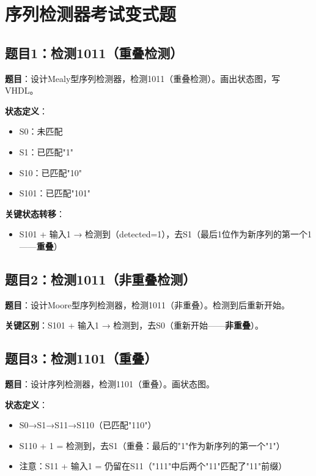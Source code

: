 \chapter{序列检测器考试变式题}

\section*{题目1：检测1011（重叠检测）}

\textbf{题目}：设计Mealy型序列检测器，检测1011（重叠检测）。画出状态图，写VHDL。

\textbf{状态定义}：
\begin{itemize}
  \item S0：未匹配
  \item S1：已匹配"1"
  \item S10：已匹配"10"
  \item S101：已匹配"101"
\end{itemize}

\textbf{关键状态转移}：
\begin{itemize}
  \item S101 + 输入1 → 检测到（detected=1），去S1（最后1位作为新序列的第一个1——\textbf{重叠}）
\end{itemize}

\section*{题目2：检测1011（非重叠检测）}

\textbf{题目}：设计Moore型序列检测器，检测1011（非重叠）。检测到后重新开始。

\textbf{关键区别}：S101 + 输入1 → 检测到，去S0（重新开始——\textbf{非重叠}）。

\section*{题目3：检测1101（重叠）}

\textbf{题目}：设计序列检测器，检测1101（重叠）。画状态图。

\textbf{状态定义}：
\begin{itemize}
  \item S0→S1→S11→S110（已匹配"110"）
  \item S110 + 1 = 检测到，去S1（重叠：最后的"1"作为新序列的第一个"1"）
  \item 注意：S11 + 输入1 = 仍留在S11（"111"中后两个"11"匹配了"11"前缀）
\end{itemize}

